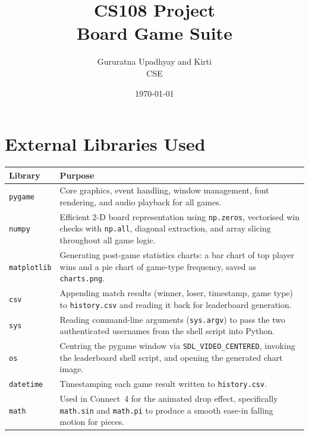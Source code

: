 \documentclass[12pt]{article}
\begin{document}
 
\title{\textbf{CS108 Project}\\[0.4em]Board Game Suite}
\author{Gururatna Upadhyay and Kirti\\
CSE}
\date{\today}
\maketitle
\thispagestyle{empty}
\newpage
 
 
\tableofcontents
\newpage
 
 
\section{External Libraries Used}
 
\begin{center}
\renewcommand{\arraystretch}{1.5}
\begin{tabular}{|p{2.8cm}|p{10cm}|}
\hline
\textbf{Library} & \textbf{Purpose} \\
\hline
\texttt{pygame} & Core graphics, event handling, window management, font rendering, and audio playback for all games. \\
\hline
\texttt{numpy} & Efficient 2-D board representation using \texttt{np.zeros}, vectorised win checks with \texttt{np.all}, diagonal extraction, and array slicing throughout all game logic. \\
\hline
\texttt{matplotlib} & Generating post-game statistics charts: a bar chart of top player wins and a pie chart of game-type frequency, saved as \texttt{charts.png}. \\
\hline
\texttt{csv} & Appending match results (winner, loser, timestamp, game type) to \texttt{history.csv} and reading it back for leaderboard generation. \\
\hline
\texttt{sys} & Reading command-line arguments (\texttt{sys.argv}) to pass the two authenticated usernames from the shell script into Python. \\
\hline
\texttt{os} & Centring the pygame window via \texttt{SDL\_VIDEO\_CENTERED}, invoking the leaderboard shell script, and opening the generated chart image. \\
\hline
\texttt{datetime} & Timestamping each game result written to \texttt{history.csv}. \\
\hline
\texttt{math} & Used in Connect~4 for the animated drop effect, specifically \texttt{math.sin} and \texttt{math.pi} to produce a smooth ease-in falling motion for pieces. \\
\hline
\end{tabular}
\end{center}
 
\end{document}
